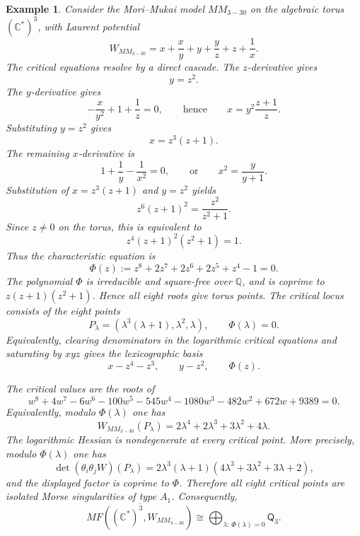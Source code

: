 \documentclass[11pt]{amsart}
\newtheorem{example}{Example}[section]
\newcommand{\MorseCat}[1]{\mathsf{Q}_{#1}}
\begin{document}
\begin{example}
Consider the Mori--Mukai model $MM_{3-30}$ on the algebraic torus
$(\mathbb{C}^*)^3$, with Laurent potential
\[
W_{MM_{3-30}}=x+\frac{x}{y}+y+\frac{y}{z}+z+\frac{1}{x}.
\]
The critical equations resolve by a direct cascade. The $z$-derivative gives
\[
y=z^2.
\]
The $y$-derivative gives
\[
-\frac{x}{y^2}+1+\frac{1}{z}=0,
\qquad\text{hence}\qquad
x=y^2\frac{z+1}{z}.
\]
Substituting $y=z^2$ gives
\[
x=z^3(z+1).
\]
The remaining $x$-derivative is
\[
1+\frac{1}{y}-\frac{1}{x^2}=0,
\qquad\text{or}\qquad
x^2=\frac{y}{y+1}.
\]
Substitution of $x=z^3(z+1)$ and $y=z^2$ yields
\[
z^6(z+1)^2=\frac{z^2}{z^2+1}.
\]
Since $z\neq0$ on the torus, this is equivalent to
\[
z^4(z+1)^2(z^2+1)=1.
\]
Thus the characteristic equation is
\[
\Phi(z):=z^8+2z^7+2z^6+2z^5+z^4-1=0.
\]
The polynomial $\Phi$ is irreducible and square-free over $\mathbb{Q}$, and is
coprime to $z(z+1)(z^2+1)$. Hence all eight roots give torus points. The
critical locus consists of the eight points
\[
P_\lambda=\left(\lambda^3(\lambda+1),\lambda^2,\lambda\right),
\qquad
\Phi(\lambda)=0.
\]
Equivalently, clearing denominators in the logarithmic critical equations and
saturating by $xyz$ gives the lexicographic basis
\[
x-z^4-z^3,
\qquad
y-z^2,
\qquad
\Phi(z).
\]

The critical values are the roots of
\[
w^8+4w^7-6w^6-100w^5-545w^4-1080w^3
-482w^2+672w+9389=0.
\]
Equivalently, modulo $\Phi(\lambda)$ one has
\[
W_{MM_{3-30}}(P_\lambda)=2\lambda^4+2\lambda^3+3\lambda^2+4\lambda.
\]
The logarithmic Hessian is nondegenerate at every critical point. More
precisely, modulo $\Phi(\lambda)$ one has
\[
\det(\theta_i\theta_jW)(P_\lambda)
=2\lambda^3(\lambda+1)(4\lambda^3+3\lambda^2+3\lambda+2),
\]
and the displayed factor is coprime to $\Phi$. Therefore all eight critical
points are isolated Morse singularities of type $A_1$. Consequently,
\[
\overline{MF((\mathbb{C}^*)^3,W_{MM_{3-30}})}
\cong \bigoplus_{\lambda:\,\Phi(\lambda)=0}\MorseCat{3}.
\]
\end{example}
\end{document}

